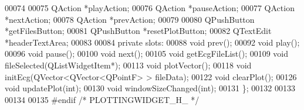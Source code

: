 \begin{DoxyCode}
00074 
00075     QAction *playAction;
00076     QAction *pauseAction;
00077     QAction *nextAction;
00078     QAction *prevAction;
00079 
00080     QPushButton *getFilesButton;
00081     QPushButton *resetPlotButton;
00082     QTextEdit *headerTextArea;
00083 
00084 \textcolor{keyword}{private} slots:
00088     \textcolor{keywordtype}{void} prev();
00092     \textcolor{keywordtype}{void} play();
00096     \textcolor{keywordtype}{void} pause();
00100     \textcolor{keywordtype}{void} next();
00105     \textcolor{keywordtype}{void} getEcgFileList();
00109     \textcolor{keywordtype}{void} fileSelected(QListWidgetItem*);
00113     \textcolor{keywordtype}{void} plotVector();
00118     \textcolor{keywordtype}{void} initEcg(QVector<QVector<QPointF> > fileData);
00122     \textcolor{keywordtype}{void} clearPlot();
00126     \textcolor{keywordtype}{void} updatePlot(\textcolor{keywordtype}{int});
00130     \textcolor{keywordtype}{void} windowSizeChanged(\textcolor{keywordtype}{int});
00131 \};
00132 
00133 
00134 
00135 \textcolor{preprocessor}{#endif }\textcolor{comment}{/* PLOTTINGWIDGET\_H\_ */}\textcolor{preprocessor}{}
\end{DoxyCode}
